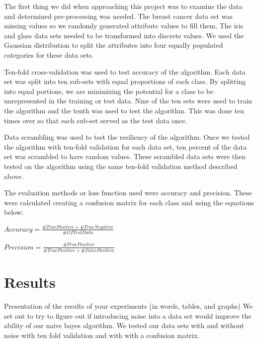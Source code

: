 \documentclass{article}
\begin{document}
The first thing we did when approaching this project was to examine the data and determined pre-processing was needed. The breast cancer data set was missing values so we randomly generated attribute values to fill them. The iris and glass data sets needed to be transformed into discrete values. We used the Gaussian distribution to split the attributes into four equally populated categories for these data sets.

Ten-fold cross-validation was used to test accuracy of the algorithm.  Each data set was split into ten sub-sets with equal proportions of each class. By splitting into equal portions, we are minimizing the potential for a class to be unrepresented in the training or test data. Nine of the ten sets were used to train the algorithm and the tenth was used to test the algorithm. This was done ten times over so that each sub-set served as the test data once. 

Data scrambling was used to test the resiliency of the algorithm. Once we tested the algorithm with ten-fold validation for each data set, ten percent of the data set was scrambled to have random values. These scrambled data sets were then tested on the algorithm using the same ten-fold validation method described above.   

The evaluation methods or loss function used were accuracy and precision. These were calculated creating a confusion matrix for each class and using the equations below:
\begin{center}
    $Accuracy = \frac{\#TruePositive + \#TrueNegative}{\# Of TestData}$\\
\end{center}

\begin{center}
    $Precision = \frac{\#TruePositive}{\#TruePositive + \#FalsePositive}$\\
\end{center}

\section{Results}

Presentation of the results of your experiments (in words, tables, and graphs)
We set out to try to figure out if introducing noise into a data set would improve the ability of our naive bayes algorithm. We tested our data sets with and without noise with ten fold validation and with with a confusion matrix.\\
\end{document}

